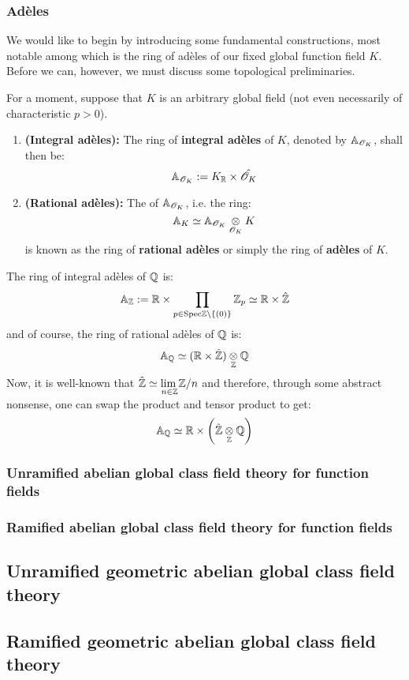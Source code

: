             \subsubsection{Ad\`eles}
                We would like to begin by introducing some fundamental constructions, most notable among which is the ring of ad\`eles of our fixed global function field $K$. Before we can, however, we must discuss some topological preliminaries.
                    \begin{definition}[Ad\`eles] \label{def: ring_of_adeles}
                        For a moment, suppose that $K$ is an arbitrary global field (not even necessarily of characteristic $p > 0$). 
                            \begin{enumerate}
                                \item \textbf{(Integral ad\`eles):} The ring of \textbf{integral ad\`eles} of $K$, denoted by $\mathbb{A}_{\mathscr{O}_K}$, shall then be:
                                    $$\A_{\scrO_K} := K_{\R} \x \hat{\scrO_K}$$
                                \item \textbf{(Rational ad\`eles):} The  of $\mathbb{A}_{\mathscr{O}_K}$, i.e. the ring:
                                    $$\A_K \cong \A_{\scrO_K} \tensor_{\scrO_K} K$$
                                is known as the ring of \textbf{rational ad\`eles} or simply the ring of \textbf{ad\`eles} of $K$.
                            \end{enumerate}
                    \end{definition}
                    \begin{example} \label{example: adeles_of_Q}
                        The ring of integral ad\`eles of $\mathbb{Q}$ is:
                            $$\A_{\Z} := \R \x \prod_{p \in \Spec \Z \setminus \{(0)\}} \Z_p \cong \R \x \hat{\Z}$$
                        and of course, the ring of rational ad\`eles of $\mathbb{Q}$ is:
                            $$\A_{\Q} \cong (\R \x \hat{\Z}) \tensor_{\Z} \Q$$
                        Now, it is well-known that $\hat{\mathbb{Z}} \simeq \underset{n \in \mathbb{Z}}{\operatorname{lim} \:} \mathbb{Z}/n$ and therefore, through some abstract nonsense, one can swap the product and tensor product to get:
                            $$\A_{\Q} \cong \R \x \left(\hat{\Z} \tensor_{\Z} \Q\right)$$
                    \end{example}
            
            \subsubsection{Unramified abelian global class field theory for function fields}
            
            \subsubsection{Ramified abelian global class field theory for function fields}
    
        \subsection{Unramified geometric abelian global class field theory}
        
        \subsection{Ramified geometric abelian global class field theory}